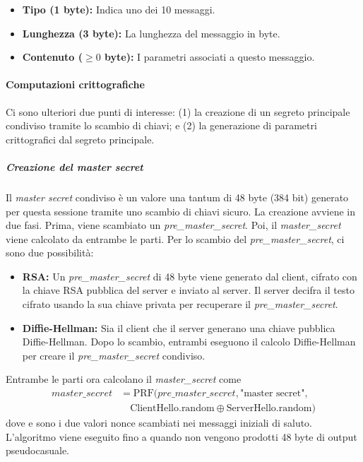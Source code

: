 \documentclass{article}
\theoremstyle{definition}
\begin{document}
\begin{itemize}
    \item \textbf{Tipo (1 byte):} Indica uno dei 10 messaggi.
    \item \textbf{Lunghezza (3 byte):} La lunghezza del messaggio in byte.
    \item \textbf{Contenuto (\(\geq 0\) byte):} I parametri associati a questo messaggio.
\end{itemize}

\paragraph{Computazioni crittografiche}

Ci sono ulteriori due punti di interesse: (1) la creazione di un segreto principale condiviso tramite lo scambio di chiavi; e (2) la generazione di parametri crittografici dal segreto principale.

\subparagraph{Creazione del master secret}
 Il \textit{master secret} condiviso è un valore una tantum di 48 byte (384 bit) generato per questa sessione tramite uno scambio di chiavi sicuro. La creazione avviene in due fasi. Prima, viene scambiato un \textit{pre\_master\_secret}. Poi, il \textit{master\_secret} viene calcolato da entrambe le parti. Per lo scambio del \textit{pre\_master\_secret}, ci sono due possibilità:

\begin{itemize}
    \item \textbf{RSA:} Un \textit{pre\_master\_secret} di 48 byte viene generato dal client, cifrato con la chiave RSA pubblica del server e inviato al server. Il server decifra il testo cifrato usando la sua chiave privata per recuperare il \textit{pre\_master\_secret}.
    \item \textbf{Diffie-Hellman:} Sia il client che il server generano una chiave pubblica Diffie-Hellman. Dopo lo scambio, entrambi eseguono il calcolo Diffie-Hellman per creare il \textit{pre\_master\_secret} condiviso.
\end{itemize}

Entrambe le parti ora calcolano il \textit{master\_secret} come
\begin{align*}
\textit{master\_secret} &= \text{PRF}(\textit{pre\_master\_secret}, \text{"master secret"}, \\
&\quad \text{ClientHello.random} \oplus \text{ServerHello.random})
\end{align*}
dove  e  sono i due valori nonce scambiati nei messaggi iniziali di saluto. L'algoritmo viene eseguito fino a quando non vengono prodotti 48 byte di output pseudocasuale.
\end{document}

